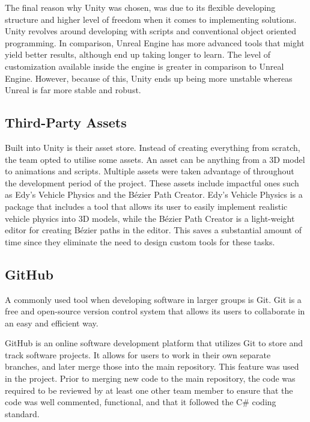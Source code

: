         The final reason why Unity was chosen, was due to its flexible developing structure and higher level of freedom when it comes to implementing solutions. Unity revolves around developing with scripts and conventional object oriented programming. In comparison, Unreal Engine has more advanced tools that might yield better results, although end up taking longer to learn. The level of customization available inside the engine is greater in comparison to Unreal Engine. However, because of this, Unity ends up being more unstable whereas Unreal is far more stable and robust.

    \subsection{Third-Party Assets}
        Built into Unity is their asset store. Instead of creating everything from scratch, the team opted to utilise some assets. An asset can be anything from a 3D model to animations and scripts. Multiple assets were taken advantage of throughout the development period of the project. These assets include impactful ones such as Edy's Vehicle Physics and the Bézier Path Creator\cite{bpc}. Edy's Vehicle Physics is a package that includes a tool that allows its user to easily implement realistic vehicle physics into 3D models, while the Bézier Path Creator is a light-weight editor for creating Bézier paths in the editor. This saves a substantial amount of time since they eliminate the need to design custom tools for these tasks.

    \subsection{GitHub}
        A commonly used tool when developing software in larger groups is Git\cite{git}. Git is a free and open-source version control system that allows its users to collaborate in an easy and efficient way. 

        GitHub\cite{github} is an online software development platform that utilizes Git to store and track software projects. It allows for users to work in their own separate branches, and later merge those into the main repository. This feature was used in the project. Prior to merging new code to the main repository, the code was required to be reviewed by at least one other team member to ensure that the code was well commented, functional, and that it followed the C\# coding standard.



